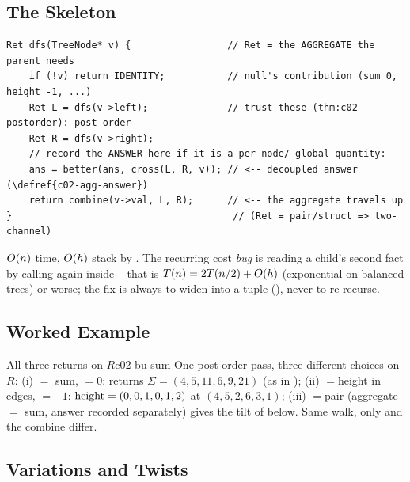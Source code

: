\subsection{The Skeleton}

\begin{lstlisting}[caption={The bottom-up skeleton: SLOT 1 (return type) and SLOT 3 (combine) are the design; SLOT 2 is usually empty.}, label={lst:c02-bu-skeleton}]
Ret dfs(TreeNode* v) {                 // Ret = the AGGREGATE the parent needs
    if (!v) return IDENTITY;           // null's contribution (sum 0, height -1, ...)
    Ret L = dfs(v->left);              // trust these (thm:c02-postorder): post-order
    Ret R = dfs(v->right);
    // record the ANSWER here if it is a per-node/ global quantity:
    ans = better(ans, cross(L, R, v)); // <-- decoupled answer (\defref{c02-agg-answer})
    return combine(v->val, L, R);      // <-- the aggregate travels up
}                                       // (Ret = pair/struct => two-channel)
\end{lstlisting}

\begin{complexitybox}
$O(n)$ time, $O(h)$ stack by . The recurring cost
\emph{bug} is reading a child's second fact by calling  again inside
 -- that is $T(n)=2T(n/2)+O(h)$ (exponential on balanced
trees) or worse; the fix is always to widen  into a tuple
(), never to re-recurse.
\end{complexitybox}

\subsection{Worked Example}

\begin{example}{All three returns on $R$}{c02-bu-sum}
One post-order pass, three different  choices on $R$:
(i) $=$ sum, $=0$: returns
$\Sigma=(4,5,11,6,9,21)$ (as in );
(ii) $=$height in edges, $=-1$:
$\operatorname{height}=(0,0,1,0,1,2)$ at $(4,5,2,6,3,1)$;
(iii) $=$pair (aggregate $=$ sum, answer recorded separately) gives the
tilt of  below. Same walk, only  and the combine differ.
\end{example}

\subsection{Variations and Twists}

